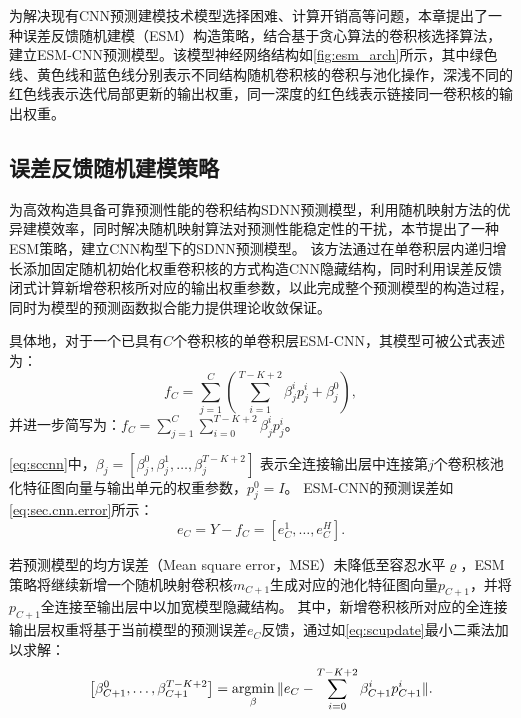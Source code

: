 为解决现有CNN预测建模技术模型选择困难、计算开销高等问题，本章提出了一种误差反馈随机建模（ESM）构造策略，结合基于贪心算法的卷积核选择算法，建立ESM-CNN预测模型。该模型神经网络结构如\autoref{fig:esm_arch}所示，其中绿色线、黄色线和蓝色线分别表示不同结构随机卷积核的卷积与池化操作，深浅不同的红色线表示迭代局部更新的输出权重，同一深度的红色线表示链接同一卷积核的输出权重。

\subsection{误差反馈随机建模策略\label{sec:esm.esm}}
为高效构造具备可靠预测性能的卷积结构SDNN预测模型，利用随机映射方法的优异建模效率，同时解决随机映射算法对预测性能稳定性的干扰，本节提出了一种ESM策略，建立CNN构型下的SDNN预测模型。
该方法通过在单卷积层内递归增长添加固定随机初始化权重卷积核的方式构造CNN隐藏结构，同时利用误差反馈闭式计算新增卷积核所对应的输出权重参数，以此完成整个预测模型的构造过程，同时为模型的预测函数拟合能力提供理论收敛保证。

具体地，对于一个已具有$C$个卷积核的单卷积层ESM-CNN，其模型可被公式表述为：
\begin{equation}
    \label{eq:sccnn}
    f_C = \sum^C_{j=1} \left( \sum^{T-K+2}_{i=1}\beta_{j}^i p_j^i + \beta^0_j \right),
\end{equation}
并进一步简写为：$f_C= \sum^C_{j=1}\sum^{T-K+2}_{i=0} \beta_j^i p_j^i$。



\autoref{eq:sccnn}中，$\beta_j = [\beta_j^0, \beta_j^1, \ldots, \beta_j^{T-K+2}]$ 表示全连接输出层中连接第$j$个卷积核池化特征图向量与输出单元的权重参数，$p_j^0 = I$。
ESM-CNN的预测误差如\autoref{eq:sec.cnn.error}所示：
\begin{equation}
    e_C = Y- f_C = [e_C^1,\ldots, e_C^H]. \label{eq:sec.cnn.error}
\end{equation}

若预测模型的均方误差（Mean square error，MSE）未降低至容忍水平$\varrho$，ESM策略将继续新增一个随机映射卷积核$m_{C+1}$生成对应的池化特征图向量$p_{C+1}$，并将$p_{C+1}$全连接至输出层中以加宽模型隐藏结构。
其中，新增卷积核所对应的全连接输出层权重将基于当前模型的预测误差$e_C$反馈，通过如\autoref{eq:scupdate}最小二乘法加以求解：
\begin{equation}\label{eq:scupdate}
    \left[\beta_{{C+1}}^0, \ldots, \beta_{{C+1}}^{T-K+2} \right]=\operatorname*{argmin} _{\beta}\|e_C -\sum_{i=0}^{T-K+2} \beta_{C+1}^i p_{C+1}^i \|.
\end{equation}

